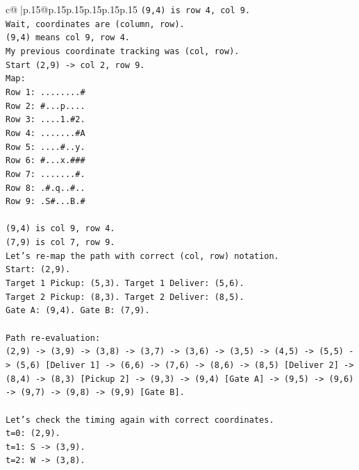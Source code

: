 \documentclass{article}
\begin{document}
{\begin{supertabular}{c@{$\;$}|p{.15\linewidth}@{}p{.15\linewidth}p{.15\linewidth}p{.15\linewidth}p{.15\linewidth}p{.15\linewidth}}
{{{\texttt{(9,4) is row 4, col 9.} \\
\texttt{Wait, coordinates are (column, row).} \\
\texttt{(9,4) means col 9, row 4.} \\
\texttt{My previous coordinate tracking was (col, row).} \\
\texttt{Start (2,9) {-}> col 2, row 9.} \\
\texttt{Map:} \\
\texttt{Row 1: ........\#} \\
\texttt{Row 2: \#...p....} \\
\texttt{Row 3: ....1.\#2.} \\
\texttt{Row 4: .......\#A} \\
\texttt{Row 5: ....\#..y.} \\
\texttt{Row 6: \#...x.\#\#\#} \\
\texttt{Row 7: .......\#.} \\
\texttt{Row 8: .\#.q..\#..} \\
\texttt{Row 9: .S\#...B.\#} \\
\\ 
\texttt{(9,4) is col 9, row 4.} \\
\texttt{(7,9) is col 7, row 9.} \\
\texttt{Let's re{-}map the path with correct (col, row) notation.} \\
\texttt{Start: (2,9).} \\
\texttt{Target 1 Pickup: (5,3). Target 1 Deliver: (5,6).} \\
\texttt{Target 2 Pickup: (8,3). Target 2 Deliver: (8,5).} \\
\texttt{Gate A: (9,4). Gate B: (7,9).} \\
\\ 
\texttt{Path re{-}evaluation:} \\
\texttt{(2,9) {-}> (3,9) {-}> (3,8) {-}> (3,7) {-}> (3,6) {-}> (3,5) {-}> (4,5) {-}> (5,5) {-}> (5,6) {[}Deliver 1{]} {-}> (6,6) {-}> (7,6) {-}> (8,6) {-}> (8,5) {[}Deliver 2{]} {-}> (8,4) {-}> (8,3) {[}Pickup 2{]} {-}> (9,3) {-}> (9,4) {[}Gate A{]} {-}> (9,5) {-}> (9,6) {-}> (9,7) {-}> (9,8) {-}> (9,9) {[}Gate B{]}.} \\
\\ 
\texttt{Let's check the timing again with correct coordinates.} \\
\texttt{t=0: (2,9).} \\
\texttt{t=1: S {-}> (3,9).} \\
\texttt{t=2: W {-}> (3,8).} \\
}}}
\end{supertabular}}
\end{document}
